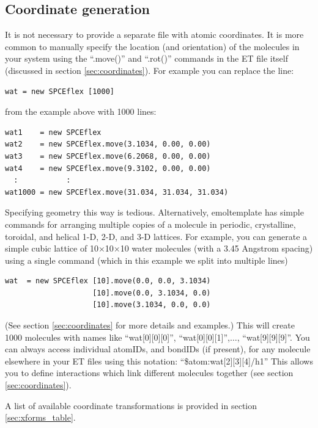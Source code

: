 \documentclass[11pt]{article}
\begin{document}
\subsection{Coordinate generation}
\label{sec:coords_intro}
It is not necessary to provide a separate file with atomic coordinates. 
It is more common to manually specify the location 
(and orientation) of the molecules in your system using the
 ``.move()'' and ``.rot()'' commands %
in the ET file itself 
(discussed in section \ref{sec:coordinates}).
For example you can replace the line:
\begin{verbatim}
wat = new SPCEflex [1000]
\end{verbatim}
from the example above with 1000 lines:
\begin{verbatim}
wat1    = new SPCEflex
wat2    = new SPCEflex.move(3.1034, 0.00, 0.00)
wat3    = new SPCEflex.move(6.2068, 0.00, 0.00)
wat4    = new SPCEflex.move(9.3102, 0.00, 0.00)
  :           :
wat1000 = new SPCEflex.move(31.034, 31.034, 31.034)
\end{verbatim}
Specifying geometry this way is tedious.
Alternatively, emoltemplate has simple commands for arranging multiple 
copies of a molecule in periodic, crystalline, toroidal, and helical 
1-D, 2-D, and 3-D lattices.  
For example, you can generate a simple cubic lattice of 
10$\times$10$\times$10 water molecules
(with a 3.45 Angstrom spacing)
using a single command 
(which in this example we split into multiple lines)
\begin{verbatim}
wat  = new SPCEflex [10].move(0.0, 0.0, 3.1034) 
                    [10].move(0.0, 3.1034, 0.0) 
                    [10].move(3.1034, 0.0, 0.0)
\end{verbatim}
(See section \ref{sec:coordinates} for more details and examples.)
This will create 1000 molecules with names like
``wat[0][0][0]'', ``wat[0][0][1]'',$\ldots$, ``wat[9][9][9]''.
You can always access individual atomIDs, and bondIDs
(if present), for any molecule 
elsewhere in your ET files using this notation:
``\$atom:wat[2][3][4]/h1''
This allows you to define interactions which link
different molecules together (see section \ref{sec:coordinates}).

A list of available coordinate transformations 
is provided in section \ref{sec:xforms_table}.

\end{document}
